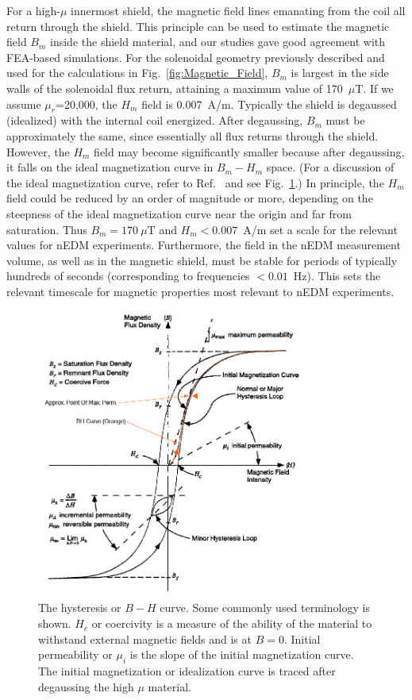 For a high-$\mu$ innermost shield, the magnetic field lines emanating
from the coil all return through the shield.  This principle can be
used to estimate the magnetic field $B_m$ inside the shield material,
and our studies gave good agreement with FEA-based simulations.  For
the solenoidal geometry previously described and used for the
calculations in Fig.~\ref{fig:Magnetic_Field}, $B_m$ is largest in the
side walls of the solenoidal flux return, attaining a maximum value of
170~$\mu$T.  If we assume $\mu_r$=20,000, the $H_m$ field is
0.007~A/m.  Typically the shield is degaussed (idealized) with the
internal coil energized. After degaussing, $B_m$ must be approximately
the same, since essentially all flux returns through the shield.
However, the $H_m$ field may become significantly smaller because
after degaussing, it falls on the ideal magnetization curve in
$B_m-H_m$ space.  (For a discussion of the ideal magnetization curve,
refer to Ref.~\cite{bozorth1993ferromagnetism} and see
Fig.~\ref{fig:bh}.)  In principle, the $H_m$ field could be reduced by
an order of magnitude or more, depending on the steepness of the ideal
magnetization curve near the origin and far from saturation. Thus
$B_m=170~\mu$T and $H_m<0.007$~A/m set a scale for the relevant values
for nEDM experiments.  Furthermore, the field in the nEDM measurement
volume, as well as in the magnetic shield, must be stable for periods
of typically hundreds of seconds (corresponding to frequencies
$<0.01$~Hz). This sets the relevant timescale for magnetic properties
most relevant to nEDM experiments.


\begin{figure}[h!]
  \centering
  \includegraphics[width=0.8\textwidth]{bh.jpg}
  \caption[The hysteresis or $B-H$ curve]{\cite{wiki:bh}The hysteresis
    or $B-H$ curve. Some commonly used terminology is shown. $H_c$ or
    coercivity is a measure of the ability of the material to
    withstand external magnetic fields and is at $B=0$. Initial
    permeability or $\mu_i$ is the slope of the initial magnetization
    curve. The initial magnetization or idealization curve is traced
    after degaussing the high $\mu$ material.}
  \label{fig:bh}
\end{figure}

